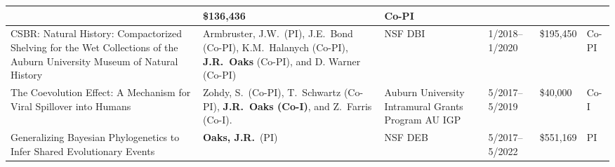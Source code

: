 {\begin{longtable}[l]{ L{0.23\textwidth} L{0.18\textwidth} L{0.17\textwidth} L{0.09\textwidth} L{0.11\textwidth} L{0.06\textwidth} }
&
\$136,436
&
Co-PI
\\
\hline
CSBR: Natural History: Compactorized Shelving for the Wet Collections of the
Auburn University Museum of Natural History
&
Armbruster, J.W.\ (PI),
J.E.\ Bond (Co-PI),
K.M.\ Halanych (Co-PI),
\textbf{J.R.\ Oaks} (Co-PI),
and
D. Warner (Co-PI)
&
NSF DBI
&
1/2018--1/2020
&
\$195,450
&
Co-PI
\\
\hline
The Coevolution Effect: A Mechanism for Viral Spillover into Humans
&
Zohdy, S.\ (Co-PI), T.\ Schwartz (Co-PI),
\textbf{J.R.\ Oaks (Co-I)}, and Z.\ Farris (Co-I).
&
Auburn University Intramural Grants Program
AU IGP
&
5/2017--5/2019
&
\$40,000
&
Co-I
\\
\hline
Generalizing Bayesian Phylogenetics to Infer Shared Evolutionary Events
&
\textbf{Oaks, J.R.}\ (PI)
&
NSF DEB
&
5/2017--5/2022
&
\$551,169
&
PI
\end{longtable}
}
